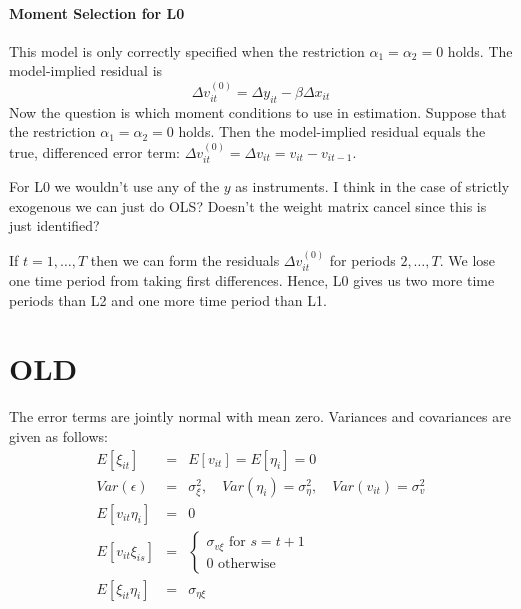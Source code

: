 \documentclass[12pt]{article}
\begin{document}
\paragraph{Moment Selection for L0} This model is only correctly specified when the restriction $\alpha_1 = \alpha_2 = 0$ holds. The model-implied residual is
$$\Delta v_{it}^{(0)}= \Delta y_{it} -  \beta \Delta x_{it}$$
Now the question is which moment conditions to use in estimation. Suppose that the restriction $\alpha_1 = \alpha_2 = 0$ holds. Then the model-implied residual equals the true, differenced error term: $\Delta v_{it}^{(0)} = \Delta v_{it}= v_{it} - v_{it-1}$. 

For L0 we wouldn't use any of the $y$ as instruments. I think in the case of strictly exogenous we can just do OLS? Doesn't the weight matrix cancel since this is just identified?

If $t = 1, \hdots, T$ then we can form the residuals $\Delta v_{it}^{(0)}$ for periods $2, \hdots, T$. We lose one time period from taking first differences. Hence, L0 gives us two more time periods than L2 and one more time period than L1.





\newpage
\section*{OLD}
The error terms are jointly normal with mean zero. Variances and covariances are given as follows:
  \begin{eqnarray*}
    E[\xi_{it}] &=& E[v_{it}] = E[\eta_i] = 0\\
    Var(\epsilon) &=& \sigma^2_{\xi}, \quad Var(\eta_i) = \sigma^2_{\eta}, \quad Var(v_{it}) = \sigma^2_v\\
    E[v_{it}\eta_i] &=& 0 \\
    E[v_{it}\xi_{is}] &=& \left\{\begin{array}{l}\sigma_{v\xi} \mbox{ for } s = t+1 \\ 0 \mbox{ otherwise } \end{array} \right.\\
    E[\xi_{it}\eta_i] &=& \sigma_{\eta\xi}
  \end{eqnarray*}
\end{document}
